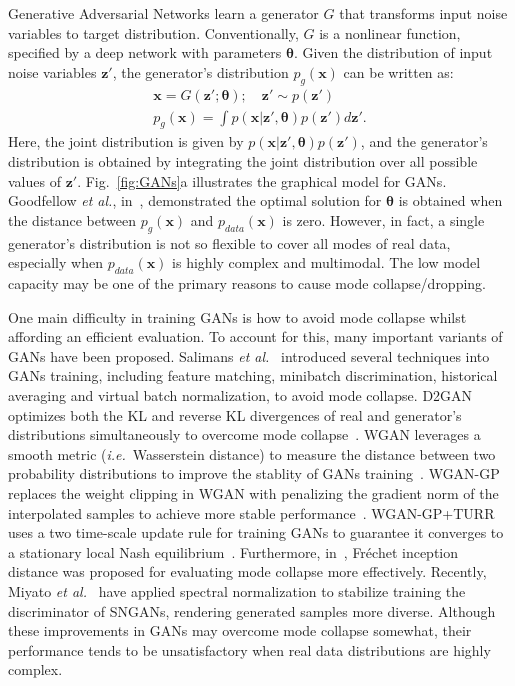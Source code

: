 \documentclass{article}
\def\etal{\emph{et al.}}
\def\ie{\emph{i.e.}}
\begin{document}
Generative Adversarial Networks learn a generator $G$ that transforms input noise variables to target distribution.
Conventionally, $G$ is a nonlinear function, specified by a deep network with parameters $\bm{\theta}$.
Given the distribution of input noise variables $\mathbf{z}'$, the generator's distribution $p_g\left(\mathbf{x}\right)$ can be written as:
\begin{gather}
\mathbf{x} = G\left(\mathbf{z}'; \bm{\theta}\right);\quad \mathbf{z}'\sim p\left(\mathbf{z}'\right) \nonumber \\
p_g\left(\mathbf{x}\right)
=
\int
p\left(\mathbf{x}|\mathbf{z}', \bm{\theta}\right) p\left(\mathbf{z}'\right)
d\mathbf{z}'.
\label{eq:Back1}
\end{gather}
Here, the joint distribution is given by $p\left(\mathbf{x}|\mathbf{z}', \bm{\theta}\right) p\left(\mathbf{z}'\right)$, and the generator's distribution is obtained by integrating the joint distribution over all possible values of $\mathbf{z}'$.
Fig.~\ref{fig:GANs}a illustrates the graphical model for GANs.
Goodfellow \etal, in~\cite{goodfellow2014generative}, demonstrated the optimal solution for $\bm{\theta}$ is obtained when the distance between $p_g\left(\mathbf{x}\right)$ and $p_{data}\left(\mathbf{x}\right)$ is zero.
However, in fact, a single generator's distribution is not so flexible to cover all modes of real data, especially when $p_{data}\left(\mathbf{x}\right)$ is highly complex and multimodal.
The low model capacity may be one of the primary reasons to cause mode collapse/dropping.



One main difficulty in training GANs is how to avoid mode collapse whilst affording an efficient evaluation.
To account for this, many important variants of GANs have been proposed.
Salimans \etal~\cite{salimans2016improved} introduced several techniques into GANs training, including feature matching, minibatch discrimination, historical averaging and virtual batch normalization, to avoid mode collapse.
D2GAN optimizes both the KL and reverse KL divergences of real and generator's distributions simultaneously to overcome mode collapse~\cite{nguyen2017dual}.
WGAN leverages a smooth metric (\ie~Wasserstein distance) to measure the distance between two probability distributions to improve the stablity of GANs training~\cite{arjovsky2015wasserstein}.
WGAN-GP replaces the weight clipping in WGAN with penalizing the gradient norm of the interpolated samples to achieve more stable performance~\cite{gulrajani2017improved}.
WGAN-GP+TURR uses a two time-scale update rule for training GANs to guarantee it converges to a stationary local Nash equilibrium~\cite{heusel2017gans}.
Furthermore, in~\cite{heusel2017gans}, Fr\'{e}chet inception distance was proposed for evaluating mode collapse more effectively.
Recently, Miyato \etal~\cite{miyato2018spectral} have applied spectral normalization to stabilize training the discriminator of SNGANs, rendering generated samples more diverse.
Although these improvements in GANs may overcome mode collapse somewhat, their performance tends to be unsatisfactory when real data distributions are highly complex.
\end{document}
